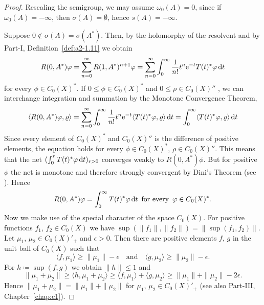 \begin{proof}
Rescaling the semigroup, we may assume $\omega_{0}(A) = 0$, 
since if $\omega_{0}(A) = -\infty$, then $\sigma(A) = \emptyset$, hence $s(A) = -\infty$.

Suppose $0 \notin \sigma(A) = \sigma(A^*)$. 
Then, by the holomorphy of the resolvent and by Part-I, Definition~\ref{def:a2-1.11} we obtain
\[
   R(0,A^*)\phi = \sum_{n=0}^{\infty} R(1,A^*)^{n+1}\phi = \sum_{n=0}^{\infty} \int_0^{\infty} \frac{1}{n!} t^n \eu^{-t}T(t)^*\phi \dt
\]  
 for every  $\phi \in C_{0}(X)^*$. 
 If\/ $0 \leq \phi \in C_{0}(X)^*$ and $0 \leq \rho \in C_{0}(X)''$ , we can interchange integration and summation by the Monotone Convergence Theorem, \ie
\begin{equation}\label{eq:b4-1.3}
   \langle R(0,A^*)\phi,\rho \rangle = \sum_{n=0}^{\infty} \int_0^{\infty} \frac{1}{n!} t^n \eu^{-t}\langle T(t)^*\phi,\rho \rangle \dt = \int_0^{\infty} \langle T(t)^*\phi,\rho \rangle \dt
\end{equation}
Since every element of\/ $C_{0}(X)^*$ and $C_{0}(X)''$ is the difference of positive
elements, the equation  holds for every $\phi \in C_{0}(X)^*$, $\rho \in C_{0}(X)''$. 
This means that the net $(\int_0^r T(t)^*\phi \dt)_{r > 0}$ converges weakly to $R(0,A^*)\phi$. 
But for positive $\phi$ the net is monotone and therefore strongly convergent by Dini's Theorem (see \textcite[II, Theorem~5.9]{schaefer:1974}). 
Hence 
\[
R(0,A^*)\phi = \int_0^{\infty} T(t)^*\phi \dt
\text{ \,for every\, }
\phi \in C_{0}(X)^*
.
\]
Now we make use of the special character of the space $C_{0}(X)$. 
For positive functions $f_1$, $f_2 \in C_{0}(X)$ we have $\sup(\|f_1\|,\|f_2\|) = \|\sup(f_1,f_2)\|$. 
Let $\mu_1$, $\mu_2 \in C_{0}(X)'_+$ and $\epsilon  >  0$. 
Then there are positive elements $f$, $g$ in the unit ball of\/ $C_{0}(X)$ such that 
%
\[
	\langle f,\mu_1 \rangle \geq \|\mu_1\| - \epsilon 
	\quad \text{and} \quad
	\langle g,\mu_2 \rangle \geq \|\mu_2\| - \epsilon.
\]
%
For $h \coloneq \sup(f,g)$ we obtain $\|h\| \leq 1$ and 
%
\[
	 \|\mu_1 + \mu_2\| \geq \langle h,\mu_1 + \mu_2 \rangle \geq \langle f,\mu_1 \rangle + \langle g,\mu_2 \rangle \geq \|\mu_1\| + \|\mu_2\| - 2\epsilon .
\]
%
Hence $\|\mu_1 + \mu_2\| = \|\mu_1\| + \|\mu_2\|$ for $\mu_1$, $\mu_2 \in C_{0}(X)'_+$ (see also Part-III, Chapter~\ref{chap:c1}).


\end{proof}
